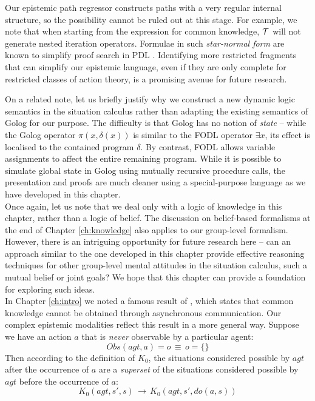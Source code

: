 Our epistemic path regressor constructs paths with a very regular
internal structure, so the possibility cannot be ruled out at this
stage. For example, we note that when starting from the expression
for common knowledge, $\mathcal{T}$ will not generate nested iteration operators.
Formulae in such \emph{star-normal form} are known to simplify proof
search in PDL \citep{abate07twb_pdl}. Identifying more restricted
fragments that can simplify our epistemic language, even if they are
only complete for restricted classes of action theory, is a promising
avenue for future research.

On a related note, let us briefly justify why we construct a new dynamic
logic semantics in the situation calculus rather than adapting the
existing semantics of Golog for our purpose. The difficulty is that
Golog has no notion of \emph{state} -- while the Golog operator $\pi(x,\delta(x))$
is similar to the FODL operator $\exists x$, its effect is localised
to the contained program $\delta$. By contrast, FODL allows variable
assignments to affect the entire remaining program. While it is possible
to simulate global state in Golog using mutually recursive procedure
calls, the presentation and proofs are much cleaner using a special-purpose
language as we have developed in this chapter.\\


Once again, let us note that we deal only with a logic of knowledge
in this chapter, rather than a logic of belief. The discussion on
belief-based formalisms at the end of Chapter \ref{ch:knowledge}
also applies to our group-level formalism. However, there is an intriguing
opportunity for future research here -- can an approach similar to
the one developed in this chapter provide effective reasoning techniques
for other group-level mental attitudes in the situation calculus,
such a mutual belief or joint goals? We hope that this chapter can
provide a foundation for exploring such ideas. \\


In Chapter \ref{ch:intro} we noted a famous result of \citet{halpern90knowledge_distrib},
which states that common knowledge cannot be obtained through asynchronous
communication. Our complex epistemic modalities reflect this result
in a more general way. Suppose we have an action $a$ that is \emph{never}
observable by a particular agent:\[
Obs(agt,a)=o\,\equiv\, o=\{\}\]
 Then according to the definition of $K_{0}$, the situations considered
possible by $agt$ after the occurrence of $a$ are a \emph{superset}
of the situations considered possible by $agt$ before the occurrence
of $a$:\[
K_{0}(agt,s',s)\,\rightarrow\, K_{0}(agt,s',do(a,s))\]



